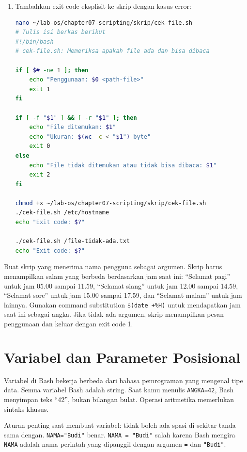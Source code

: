 \begin{enumerate}
    \item Tambahkan exit code eksplisit ke skrip dengan kasus error:
\begin{lstlisting}[language=bash, caption={Menambahkan penanganan error sederhana}]
nano ~/lab-os/chapter07-scripting/skrip/cek-file.sh
# Tulis isi berkas berikut
#!/bin/bash
# cek-file.sh: Memeriksa apakah file ada dan bisa dibaca

if [ $# -ne 1 ]; then
    echo "Penggunaan: $0 <path-file>"
    exit 1
fi

if [ -f "$1" ] && [ -r "$1" ]; then
    echo "File ditemukan: $1"
    echo "Ukuran: $(wc -c < "$1") byte"
    exit 0
else
    echo "File tidak ditemukan atau tidak bisa dibaca: $1"
    exit 2
fi

chmod +x ~/lab-os/chapter07-scripting/skrip/cek-file.sh
./cek-file.sh /etc/hostname
echo "Exit code: $?"

./cek-file.sh /file-tidak-ada.txt
echo "Exit code: $?"
\end{lstlisting}
\end{enumerate}

\begin{challengebox}
Buat skrip  yang menerima nama pengguna sebagai
argumen. Skrip harus menampilkan salam yang berbeda berdasarkan jam saat
ini: ``Selamat pagi'' untuk jam 05.00 sampai 11.59, ``Selamat siang''
untuk jam 12.00 sampai 14.59, ``Selamat sore'' untuk jam 15.00 sampai
17.59, dan ``Selamat malam'' untuk jam lainnya. Gunakan command
substitution \texttt{\$(date +\%H)} untuk mendapatkan jam saat ini
sebagai angka. Jika tidak ada argumen, skrip menampilkan pesan penggunaan
dan keluar dengan exit code 1.
\end{challengebox}

\section{Variabel dan Parameter Posisional}
\label{sec:variabel-parameter-posisional}

Variabel di Bash bekerja berbeda dari bahasa pemrograman yang mengenal
tipe data. Semua variabel Bash adalah string. Saat kamu
menulis \texttt{ANGKA=42}, Bash menyimpan teks ``42'', bukan bilangan
bulat. Operasi aritmetika memerlukan sintaks khusus.

Aturan penting saat membuat variabel: tidak boleh ada spasi di sekitar
tanda sama dengan. \texttt{NAMA="Budi"} benar. \texttt{NAMA = "Budi"}
salah karena Bash mengira \texttt{NAMA} adalah nama perintah yang dipanggil
dengan argumen \texttt{=} dan \texttt{"Budi"}.

